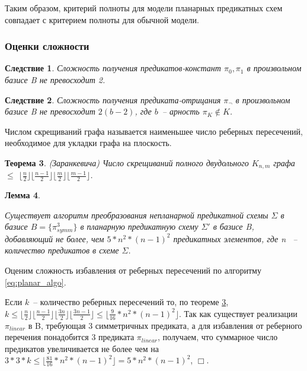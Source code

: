 \documentclass[12pt]{article}
\newtheorem{theorem}{Теорема}[section]
\newtheorem{lemma}[theorem]{Лемма}
\newtheorem{corollary}[theorem]{Следствие}
\newenvironment{proof}[1][Доказательство]{\begin{trivlist}
\item[\hskip \labelsep {\bfseries #1}]}{\end{trivlist}}
\newenvironment{definition}[1][Определение]{\begin{trivlist}
\item[\hskip \labelsep {\bfseries #1}]}{\end{trivlist}}
\begin{document}
Таким образом, критерий полноты для модели планарных предикатных схем совпадает с критерием полноты для обычной модели.

\subsubsection{Оценки сложности}

\begin{corollary}
\label{corol:const}
Сложность получения предикатов-констант $\pi_0, \pi_1$ в произвольном базисе B не превосходит 2.
\end{corollary}

\begin{corollary}
\label{corol:negate}
Сложность получения предиката-отрицания $\pi_{\neg}$ в произвольном базисе B не превосходит $2(b-2)$, 
где $b$~-- арность $\pi_K \notin K$.
\end{corollary}

\begin{definition}
Числом скрещиваний графа называется наименьшее число реберных пересечений, необходимое для укладки графа на плоскость.
\end{definition}

\begin{theorem}
\label{ZarankTheorem}
(Заранкевича) Число скрещиваний полного двудольного $K_{n,m}$ графа $\leq$
$\lfloor \frac{n}{2} \rfloor \lfloor \frac{n-1}{2} \rfloor \lfloor \frac{m}{2} \rfloor \lfloor \frac{m-1}{2} \rfloor$.
\cite{Zarank54}
\end{theorem}

\begin{lemma}
\label{eq:planar_algo_complexity}

Существует алгоритм преобразования непланарной предикатной схемы $\Sigma$ в базисе $B=\{\pi_{symm}^3\}$
в планарную предикатную схему $\Sigma'$ в базисе B, добавляющий не более, чем 
$5 * n^2*(n-1)^2 $ предикатных элементов, где n ~-- количество предикатов в схеме $\Sigma$.
\end{lemma}

\begin{proof}
Оценим сложность избавления от реберных пересечений по алгоритму \ref{eq:planar_algo}.

Если $k$~-- количество реберных пересечений то, по теореме \ref{ZarankTheorem}, 
$k \leq \lfloor \frac{n}{2} \rfloor \lfloor \frac{n-1}{2} \rfloor \lfloor \frac{3n}{2} \rfloor \lfloor \frac{3n-1}{2} \rfloor \le \lfloor \frac{9}{16} * n^2*(n-1)^2 \rfloor$.
Так как существует реализации $\pi_{linear}$ в B, требующая 3 симметричных предиката, а для избавления
от реберного перечения понадобится 3 предиката $\pi_{linear}$, получаем, 
что суммарное число предикатов увеличивается не более чем на
$3*3*k \leq \lfloor \frac{81}{16} * n^2 * (n-1)^2 \rfloor = 5 * n^2 * (n-1)^2$, $\Box$.
\end{proof}
\end{document}
